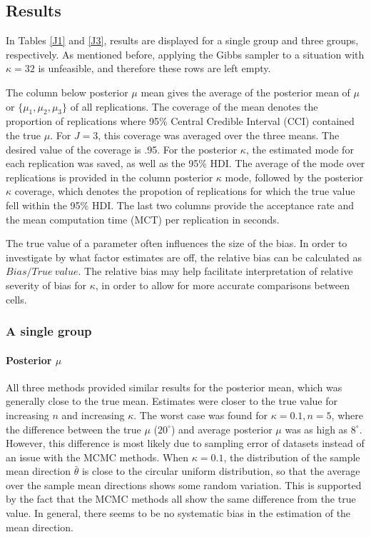 \documentclass[]{gSCS2e}
\theoremstyle{plain}
\theoremstyle{definition}
\theoremstyle{remark}
\begin{document}
\subsection{Results}

In Tables \ref{J1} and \ref{J3}, results are displayed for a single group and three groups, respectively. As mentioned before, applying the Gibbs sampler to a situation with $\kappa=32$ is unfeasible, and therefore these rows are left empty. 

The column below posterior $\mu$ mean gives the average of the posterior mean of $\mu$ or $\{\mu_1, \mu_2, \mu_3 \}$ of all replications. The coverage of the mean denotes the proportion of replications where 95\% Central Credible Interval (CCI) contained the true $\mu$. For $J=3$, this coverage was averaged over the three means. The desired value of the coverage is .95. For the posterior $\kappa$, the estimated mode for each replication was saved, as well as the 95\% HDI. The average of the mode over replications is provided in the column posterior $\kappa$ mode, followed by the posterior $\kappa$ coverage, which denotes the propotion of replications for which the true value fell within the 95\% HDI. The last two columns provide the acceptance rate and the mean computation time (MCT) per replication in seconds. 

The true value of a parameter often influences the size of the bias. In order to investigate by what factor estimates are off, the relative bias can be calculated as $Bias/True~value$. The relative bias may help facilitate interpretation of relative severity of bias for $\kappa$, in order to allow for more accurate comparisons between cells. 

\subsubsection{A single group}
\paragraph{Posterior $\mu$}

All three methods provided similar results for the posterior mean, which was generally close to the true mean. Estimates were closer to the true value for increasing $n$ and increasing $\kappa$. The worst case was found for $\kappa=0.1, n=5$, where the difference between the true $\mu$ ($20^\circ$) and average posterior $\mu$ was as high as $8^\circ$. However, this difference is most likely due to sampling error of datasets instead of an issue with the MCMC methods. When $\kappa=0.1$, the distribution of the sample mean direction $\bar{\theta}$ is close to the circular uniform distribution, so that the average over the sample mean directions shows some random variation. This is supported by the fact that the MCMC methods all show the same difference from the true value. In general, there seems to be no systematic bias in the estimation of the mean direction. 
\end{document}
